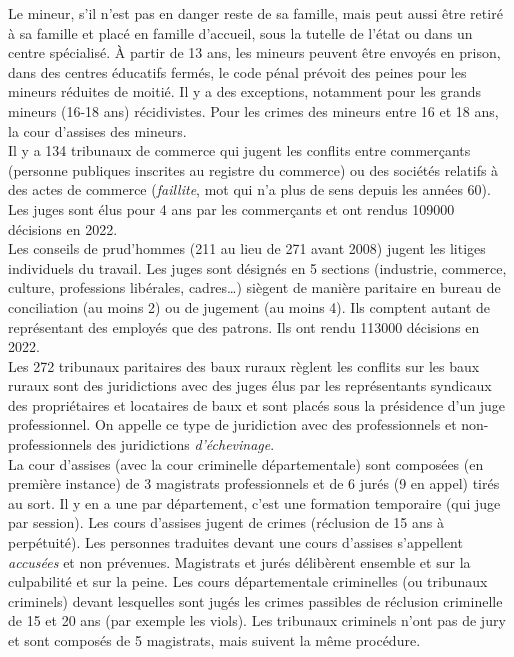 \documentclass[math]{cours}
\begin{document}
	Le mineur, s'il n'est pas en danger reste de sa famille, mais peut aussi être retiré à sa famille et placé en famille d'accueil, sous la tutelle de l'état ou dans un centre spécialisé.
	À partir de 13 ans, les mineurs peuvent être envoyés en prison, dans des centres éducatifs fermés, le code pénal prévoit des peines pour les mineurs réduites de moitié.
	Il y a des exceptions, notamment pour les grands mineurs (16-18 ans) récidivistes.
	Pour les crimes des mineurs entre 16 et 18 ans, la cour d'assises des mineurs. \\
	Il y a 134 tribunaux de commerce qui jugent les conflits entre commerçants (personne publiques inscrites au registre du commerce) ou des sociétés relatifs à des actes de commerce (\textit{faillite}, mot qui n'a plus de sens depuis les années 60).
	Les juges sont élus pour 4 ans par les commerçants et ont rendus 109000 décisions en 2022.\\
	Les conseils de prud'hommes (211 au lieu de 271 avant 2008) jugent les litiges individuels du travail.
	Les juges sont désignés en 5 sections (industrie, commerce, culture, professions libérales, cadres\ldots) siègent de manière paritaire en bureau de conciliation (au moins 2) ou de jugement (au moins 4).
	Ils comptent autant de représentant des employés que des patrons.
	Ils ont rendu 113000 décisions en 2022.\\
	Les 272 tribunaux paritaires des baux ruraux règlent les conflits sur les baux ruraux sont des juridictions avec des juges élus par les représentants syndicaux des propriétaires et locataires de baux et sont placés sous la présidence d'un juge professionnel.
	On appelle ce type de juridiction avec des professionnels et non-professionnels des juridictions \emph{d'échevinage}.\\
	La cour d'assises (avec la cour criminelle départementale) sont composées (en première instance) de 3 magistrats professionnels et de 6 jurés (9 en appel) tirés au sort.
	Il y en a une par département, c'est une formation temporaire (qui juge par session).
	Les cours d'assises jugent de crimes (réclusion de 15 ans à perpétuité).
	Les personnes traduites devant une cours d'assises s'appellent \emph{accusées} et non prévenues.
	Magistrats et jurés délibèrent ensemble et sur la culpabilité et sur la peine.
	Les cours départementale criminelles (ou tribunaux criminels) devant lesquelles sont jugés les crimes passibles de réclusion criminelle de 15 et 20 ans (par exemple les viols).
	Les tribunaux criminels n'ont pas de jury et sont composés de 5 magistrats, mais suivent la même procédure.
\end{document}
